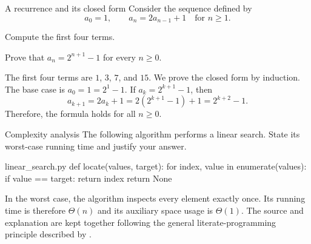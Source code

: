 \documentclass[letterpaper,11pt]{article}
\begin{document}
\makehomeworktitle

\begin{problem}[10 points]{A recurrence and its closed form}
  Consider the sequence defined by
  \[
    a_0 = 1,
    \qquad
    a_n = 2a_{n-1} + 1 \quad \text{for } n \geq 1.
  \]
  \begin{subproblems}
    \item Compute the first four terms.
    \item Prove that $a_n = 2^{n+1}-1$ for every $n \geq 0$.
  \end{subproblems}

  \begin{solution}
    The first four terms are $1$, $3$, $7$, and $15$.
    We prove the closed form by induction.
    The base case is $a_0=1=2^1-1$.
    If $a_k=2^{k+1}-1$, then
    \[
      a_{k+1}=2a_k+1
      =2\left(2^{k+1}-1\right)+1
      =2^{k+2}-1.
    \]
    Therefore, the formula holds for all $n\geq 0$.
  \end{solution}
\end{problem}

\begin{problem}[5 points]{Complexity analysis}
  The following algorithm performs a linear search.
  State its worst-case running time and justify your answer.

  \begin{codebox}[python]{linear_search.py}
def locate(values, target):
    for index, value in enumerate(values):
        if value == target:
            return index
    return None
  \end{codebox}

  \begin{solution}
    In the worst case, the algorithm inspects every element exactly once.
    Its running time is therefore $\Theta(n)$ and its auxiliary space usage is $\Theta(1)$.
    The source and explanation are kept together following the general literate-programming principle described by \citet{knuth1984literate}.
  \end{solution}
\end{problem}



\end{document}
